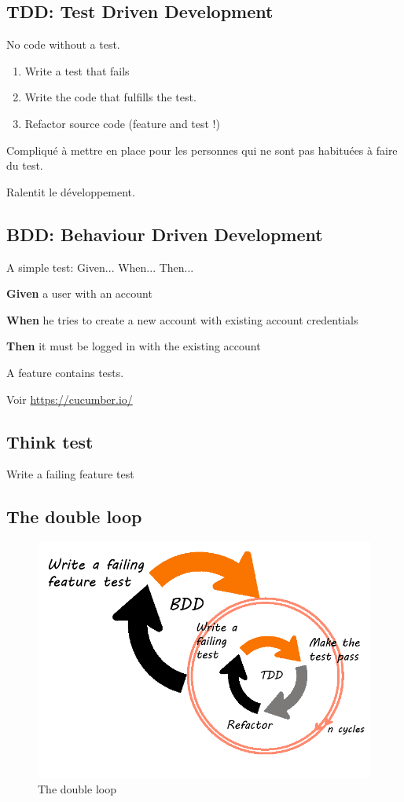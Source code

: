 \documentclass[a4paper,11pt]{article}
\begin{document}
\subsection{TDD: Test Driven Development}

No code without a test.

\begin{enumerate}
\item Write a test that fails
\item Write the code that fulfills the test.
\item Refactor source code (feature and test !)
\end{enumerate}

Compliqué à mettre en place pour les personnes qui ne sont pas habituées à faire
du test.

Ralentit le développement.

\subsection{BDD: Behaviour Driven Development}

A simple test: Given... When... Then...

\textbf{Given} a user with an account

\textbf{When} he tries to create a new account with existing account credentials

\textbf{Then} it must be logged in with the existing account

A feature contains tests.

Voir \url{https://cucumber.io/}

\subsection{Think test}

Write a failing feature test

\subsection{The double loop}

\begin{figure}[h]
  \centering
  \includegraphics[width = 0.6 \textwidth]{bdd-and-tdd-cycle.png}
  \caption{The double loop}
\end{figure}
\end{document}
